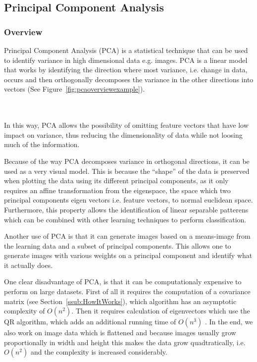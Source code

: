 \subsection{Principal Component Analysis}
\label{sub:PCA}
\subsubsection{Overview}
\label{ssub:PCAOverview}
Principal Component Analysis (PCA) is a statistical technique that can be used to identify variance in high dimensional data e.g. images.
PCA is a linear model that works by identifying the direction where most variance, i.e. change in data,
occurs and then orthogonally decomposes the variance in the other directions into vectors (See Figure~\ref{fig:pcaoverviewexample}).\\

\begin{minipage}{\linewidth}
\centering
{}
\label{fig:pcaoverviewexample}
\end{minipage}\\\\

In this way, PCA allows the possibility of omitting feature vectors that have low impact on variance,
thus reducing the dimensionality of data while not loosing much of the information.

Because of the way PCA decomposes variance in orthogonal directions, it can be used as a very visual model. 
This is because the ``shape'' of the data is preserved when plotting the data using its different principal components, 
as it only requires an affine transformation from the eigenspace, the space which two principal components eigen vectors i.e. feature vectors,
to normal euclidean space.
Furthermore, this property allows the identification of linear separable patterens which can be combined with other learning techniques to
perform classification.

Another use of PCA is that it can generate images based on a means-image from the learning data and a subset of principal components.
This allows one to generate images with various weights on a principal component and identify what it actually does.

One clear disadvantage of PCA, is that it can be computationaly expensive to perform on large datasets.
First of all it requires the computation of a covariance matrix (see Section~\ref{ssub:HowItWorks}), which algorithm has an asymptotic complexity of $\mathit{O}(n^2)$.
Then it requires calculation of eigenvectors which use the QR algorithm, which adds an additional running time of $\mathit{O}(n^3)$ \cite{abenz2012qralgorithm}.
In the end, we also work on image data which is flattened and because images usually grow proportionally in width and height this makes the data grow quadtratically, i.e. $\mathit{O}(n^2)$
and the complexity is increased considerably.

